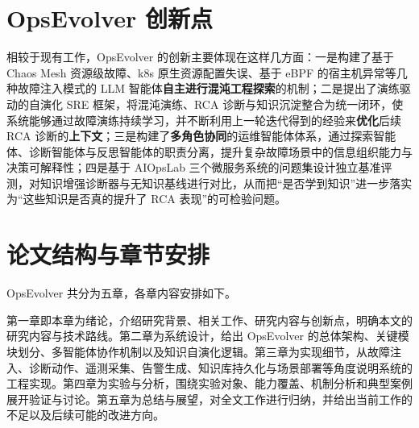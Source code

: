 \section{OpsEvolver 创新点}
\label{sec:contribution}

相较于现有工作，OpsEvolver 的创新主要体现在这样几方面：一是构建了基于 Chaos Mesh 资源级故障、k8s 原生资源配置失误、基于 eBPF 的宿主机异常等几种故障注入模式的 LLM 智能体\textbf{自主进行混沌工程探索}的机制；二是提出了演练驱动的自演化 SRE 框架，将混沌演练、RCA 诊断与知识沉淀整合为统一闭环，使系统能够通过故障演练持续学习，并不断利用上一轮迭代得到的经验来\textbf{优化}后续 RCA 诊断的\textbf{上下文}；三是构建了\textbf{多角色协同}的运维智能体体系，通过探索智能体、诊断智能体与反思智能体的职责分离，提升复杂故障场景中的信息组织能力与决策可解释性；四是基于 AIOpsLab 三个微服务系统的问题集设计独立基准评测，对知识增强诊断器与无知识基线进行对比，从而把“是否学到知识”进一步落实为“这些知识是否真的提升了 RCA 表现”的可检验问题。

\section{论文结构与章节安排}
\label{sec:arrangement}

OpsEvolver 共分为五章，各章内容安排如下。

第一章即本章为绪论，介绍研究背景、相关工作、研究内容与创新点，明确本文的研究内容与技术路线。第二章为系统设计，给出 OpsEvolver 的总体架构、关键模块划分、多智能体协作机制以及知识自演化逻辑。第三章为实现细节，从故障注入、诊断动作、遥测采集、告警生成、知识库持久化与场景部署等角度说明系统的工程实现。第四章为实验与分析，围绕实验对象、能力覆盖、机制分析和典型案例展开验证与讨论。第五章为总结与展望，对全文工作进行归纳，并给出当前工作的不足以及后续可能的改进方向。
